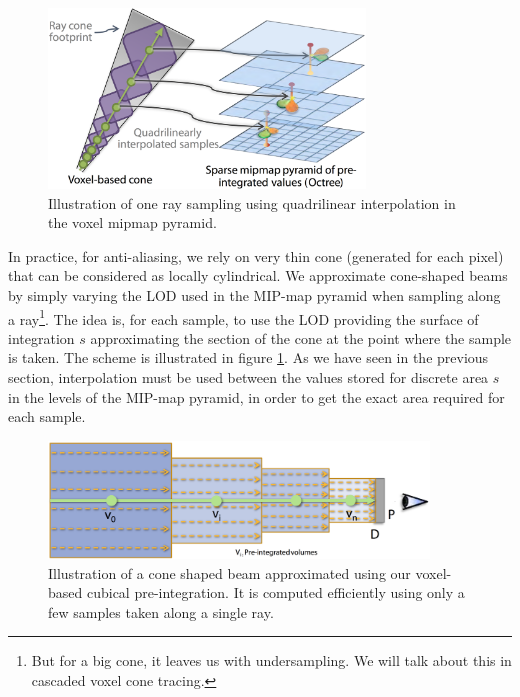 \begin{figure}
	\begin{center}
		\includegraphics[width=0.75\textwidth]{graphics/vct/vct-7-4}
	\end{center}
	\caption{Illustration of one ray sampling using quadrilinear interpolation in the voxel mipmap pyramid.}
\end{figure}

In practice, for anti-aliasing, we rely on very thin cone (generated for each pixel) that can be considered as locally cylindrical. We approximate cone-shaped beams by simply varying the LOD used in the MIP-map pyramid when sampling along a ray\footnote{But for a big cone, it leaves us with undersampling. We will talk about this in cascaded voxel cone tracing.}. The idea is, for each sample, to use the LOD providing the surface of integration $s$ approximating the section of the cone at the point where the sample is taken. The scheme is illustrated in figure \ref{f:vct-pre-integration-5}. As we have seen in the previous section, interpolation must be used between the values stored for discrete area $s$ in the levels of the MIP-map pyramid, in order to get the exact area required for each sample.

\begin{figure}\label{f:vct-pre-integration-5}
	\begin{center}
		\includegraphics[width=0.9\textwidth]{graphics/vct/vct-7-5}
	\end{center}
	\caption{Illustration of a cone shaped beam approximated using our voxel-based cubical pre-integration. It is computed efficiently using only a few samples taken along a single ray.}
\end{figure}

